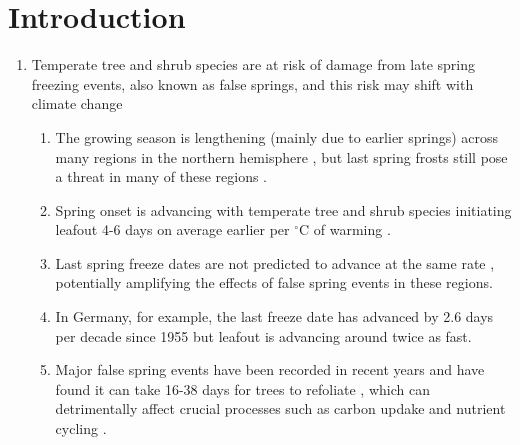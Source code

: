 \documentclass{article}\usepackage[]{graphicx}\usepackage[]{color}
\begin{document}
\section*{Introduction}
\begin{enumerate}
\item Temperate tree and shrub species are at risk of damage from late spring freezing events, also known as false springs, and this risk may shift with climate change
\begin{enumerate}
\item The growing season is lengthening (mainly due to earlier springs) across many regions in the northern hemisphere \citep{Chen2005, Liu2006, Kukal2018}, but last spring frosts still pose a threat in many of these regions \citep{Wypych2016a}.
\item Spring onset is advancing with temperate tree and shrub species initiating leafout 4-6 days on average earlier per $^{\circ}$C of warming \citep{Wolkovich2012, IPCC2014}.
\item Last spring freeze dates are not predicted to advance at the same rate \citep{Inouye2008, Martin2010, Labe2016, Sgubin2018}, potentially amplifying the effects of false spring events in these regions.
\item In Germany, for example, the last freeze date has advanced by 2.6 days per decade since 1955 \citep{Zohner2016} but leafout is advancing around twice as fast.
\item Major false spring events have been recorded in recent years and have found it can take 16-38 days for trees to refoliate \citep{Gu2008, Augspurger2009, Augspurger2013, Menzel2015}, which can detrimentally affect crucial processes such as carbon updake and nutrient cycling \citep{Hufkens2012, Richardson2013, Klosterman2018}.
\end{enumerate}



\end{enumerate}
\end{document}
